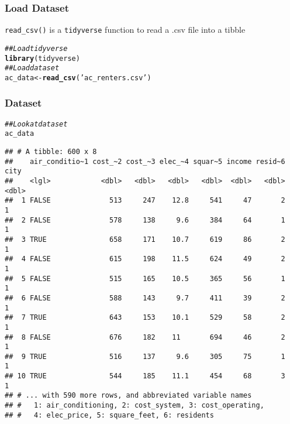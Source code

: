 \documentclass{beamer}\usepackage[]{graphicx}\usepackage[]{xcolor}
\makeatletter
\newcommand{\hlstr}[1]{\textcolor[rgb]{0.192,0.494,0.8}{#1}}%
\newcommand{\hlcom}[1]{\textcolor[rgb]{0.678,0.584,0.686}{\textit{#1}}}%
\newcommand{\hlstd}[1]{\textcolor[rgb]{0.345,0.345,0.345}{#1}}%
\newcommand{\hlkwb}[1]{\textcolor[rgb]{0.69,0.353,0.396}{#1}}%
\newcommand{\hlkwd}[1]{\textcolor[rgb]{0.737,0.353,0.396}{\textbf{#1}}}%
\newenvironment{kframe}{%
 \def\at@end@of@kframe{}%
 \ifinner\ifhmode%
  \def\at@end@of@kframe{\end{minipage}}%
  \begin{minipage}{\columnwidth}%
 \fi\fi%
 \def\FrameCommand##1{\hskip\@totalleftmargin \hskip-\fboxsep
 \colorbox{shadecolor}{##1}\hskip-\fboxsep
     \hskip-\linewidth \hskip-\@totalleftmargin \hskip\columnwidth}%
 \MakeFramed {\advance\hsize-\width
   \@totalleftmargin\z@ \linewidth\hsize
   \@setminipage}}%
 {\par\unskip\endMakeFramed%
 \at@end@of@kframe}
\newenvironment{knitrout}{}{} %
\makeatother
\begin{document}
\begin{frame}[fragile]\frametitle{Load Dataset}
    \texttt{read\_csv()} is a \texttt{tidyverse} function to read a .csv file into a tibble
\begin{knitrout}\footnotesize
{}\color{fgcolor}\begin{kframe}
\begin{alltt}
\hlcom{## Load tidyverse}
\hlkwd{library}\hlstd{(tidyverse)}
\hlcom{## Load dataset}
\hlstd{ac_data} \hlkwb{<-} \hlkwd{read_csv}\hlstd{(}\hlstr{'ac_renters.csv'}\hlstd{)}
\end{alltt}
\end{kframe}
\end{knitrout}
\end{frame}

\begin{frame}[fragile]\frametitle{Dataset}
\begin{knitrout}\footnotesize
{}\color{fgcolor}\begin{kframe}
\begin{alltt}
\hlcom{## Look at dataset}
\hlstd{ac_data}
\end{alltt}
\begin{verbatim}
## # A tibble: 600 x 8
##    air_conditio~1 cost_~2 cost_~3 elec_~4 squar~5 income resid~6  city
##    <lgl>            <dbl>   <dbl>   <dbl>   <dbl>  <dbl>   <dbl> <dbl>
##  1 FALSE              513     247    12.8     541     47       2     1
##  2 FALSE              578     138     9.6     384     64       1     1
##  3 TRUE               658     171    10.7     619     86       2     1
##  4 FALSE              615     198    11.5     624     49       2     1
##  5 FALSE              515     165    10.5     365     56       1     1
##  6 FALSE              588     143     9.7     411     39       2     1
##  7 TRUE               643     153    10.1     529     58       2     1
##  8 FALSE              676     182    11       694     46       2     1
##  9 TRUE               516     137     9.6     305     75       1     1
## 10 TRUE               544     185    11.1     454     68       3     1
## # ... with 590 more rows, and abbreviated variable names
## #   1: air_conditioning, 2: cost_system, 3: cost_operating,
## #   4: elec_price, 5: square_feet, 6: residents
\end{verbatim}
\end{kframe}
\end{knitrout}
\end{frame}
\end{document}
